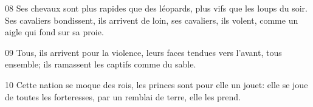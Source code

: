 
08 Ses chevaux sont plus rapides que des léopards, plus vifs que les loups du soir. Ses cavaliers bondissent, ils arrivent de loin, ses cavaliers, ils volent, comme un aigle qui fond sur sa proie.

09 Tous, ils arrivent pour la violence, leurs faces tendues vers l’avant, tous ensemble; ils ramassent les captifs comme du sable.

10 Cette nation se moque des rois, les princes sont pour elle un jouet: elle se joue de toutes les forteresses, par un remblai de terre, elle les prend.